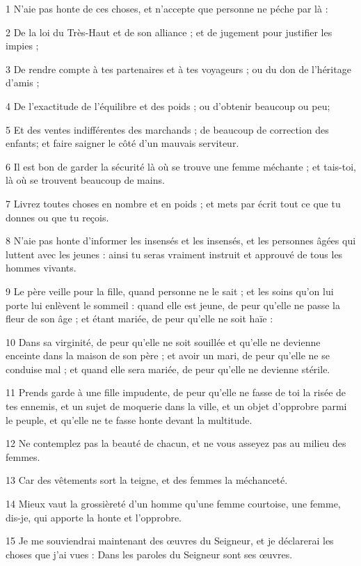 \par 1 N'aie pas honte de ces choses, et n'accepte que personne ne péche par là :
\par 2 De la loi du Très-Haut et de son alliance ; et de jugement pour justifier les impies ;
\par 3 De rendre compte à tes partenaires et à tes voyageurs ; ou du don de l'héritage d'amis ;
\par 4 De l'exactitude de l'équilibre et des poids ; ou d'obtenir beaucoup ou peu;
\par 5 Et des ventes indifférentes des marchands ; de beaucoup de correction des enfants; et faire saigner le côté d'un mauvais serviteur.
\par 6 Il est bon de garder la sécurité là où se trouve une femme méchante ; et tais-toi, là où se trouvent beaucoup de mains.
\par 7 Livrez toutes choses en nombre et en poids ; et mets par écrit tout ce que tu donnes ou que tu reçois.
\par 8 N'aie pas honte d'informer les insensés et les insensés, et les personnes âgées qui luttent avec les jeunes : ainsi tu seras vraiment instruit et approuvé de tous les hommes vivants.
\par 9 Le père veille pour la fille, quand personne ne le sait ; et les soins qu'on lui porte lui enlèvent le sommeil : quand elle est jeune, de peur qu'elle ne passe la fleur de son âge ; et étant mariée, de peur qu'elle ne soit haïe :
\par 10 Dans sa virginité, de peur qu'elle ne soit souillée et qu'elle ne devienne enceinte dans la maison de son père ; et avoir un mari, de peur qu'elle ne se conduise mal ; et quand elle sera mariée, de peur qu'elle ne devienne stérile.
\par 11 Prends garde à une fille impudente, de peur qu'elle ne fasse de toi la risée de tes ennemis, et un sujet de moquerie dans la ville, et un objet d'opprobre parmi le peuple, et qu'elle ne te fasse honte devant la multitude.
\par 12 Ne contemplez pas la beauté de chacun, et ne vous asseyez pas au milieu des femmes.
\par 13 Car des vêtements sort la teigne, et des femmes la méchanceté.
\par 14 Mieux vaut la grossièreté d'un homme qu'une femme courtoise, une femme, dis-je, qui apporte la honte et l'opprobre.
\par 15 Je me souviendrai maintenant des œuvres du Seigneur, et je déclarerai les choses que j'ai vues : Dans les paroles du Seigneur sont ses œuvres.
